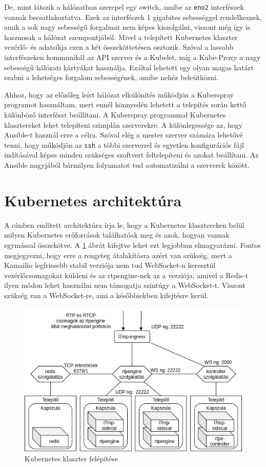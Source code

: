 De, mint látszik a hálózatban szerepel egy switch, amibe az \texttt{eno2} interfészek 
vannak becsatlakoztatva. Ezek az interfészek 1 gigabites sebességgel rendelkeznek, amik
a sok nagy sebességű forgalmat nem képes kiszolgálni, viszont még így is hasznosak
a hálózat szempontjából. Mivel a telepített Kubernetes klaszter vezérlő- és adatsíkja
ezen a két összeköttetésen osztozik. Szóval a lassabb interfészeken kommunikál az
API szerver és a Kubelet, míg a Kube-Proxy a nagy sebességű hálózati kártyákat 
használja. Ezáltal lehetett egy olyan magas határt szabni a lehetséges forgalom
sebességének, amibe nehéz beleütközni. 

Ahhoz, hogy az előzőleg leírt hálózat elkülönítés működjön a Kuberspray programot 
használtam, mert ennél könnyedén lehetett a telepítés során kettő különböző interfészt
beállítani. A Kuberspray \cite{kubespray} programmal Kubernetes klasztereket lehet 
telepíteni szimplán szerverekre. A különlegessége az, hogy Ansible-t használ erre a 
célra. Szóval elég a mester szerver számára lehetővé tenni, hogy működjön az \texttt{ssh} 
a többi szerverrel és egyetlen konfigurációs fájl indításával képes minden szükséges 
szoftvert feltelepíteni és azokat beállítani. Az Ansible \cite{ansible} nagyjából 
bármilyen folyamatot tud automatizálni a szerverek között. 

\section{Kubernetes architektúra}

A címben említett architektúra írja le, hogy a Kubernetes klasztereken belül milyen 
Kubernetes erőforrások találhatóak meg és azok, hogyan vannak egymással összekötve. A 
\ref{fig:clusterSetup} ábrát kifejtve lehet ezt legjobban elmagyarázni. Fontos 
megjegyezni, hogy erre a rengeteg átalakításra azért van szükség, mert a Kamailio 
legfrissebb stabil verziója nem tud WebSocket-n keresztül vezérlőcsomagokat küldeni és az 
rtpengine-nek az a verziója, amivel a Redis-t ilyen módon lehet használni nem támogatja 
szintúgy a WebSocket-t. Viszont szükség van a WebSocket-re, ami a későbbiekben kifejtésre 
kerül.

\begin{figure}[!ht]
	\centering
	\includegraphics[width=1\textwidth, keepaspectratio]{figures/cluster.png}
	\caption{Kubernetes klaszter felépítése}
	\label{fig:clusterSetup}
\end{figure}

